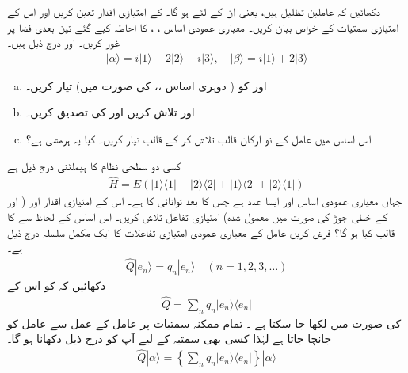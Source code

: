  
دکھائیں کہ عاملین تظلیل  ہیں، یعنی ان کے لئے ہو گا۔  کے امتیازی اقدار تعین کریں اور اس کے امتیازی سمتیات کے خواص بیان کریں۔
 معیاری عمودی اساس ،  ،  کا احاطہ کیے گئے تین بعدی فضا پر غور کریں۔  اور  درج ذیل ہیں۔ 
\begin{align*}
| \alpha \rangle = i | 1 \rangle -2|2\rangle -i|3\rangle , \quad | \beta \rangle = i|1\rangle +2|3\rangle 
\end{align*}
\begin{enumerate}[a.]
\item
  اور  کو ( دوہری اساس  ،،  کی صورت میں) تیار کریں۔ 
\item
  اور  تلاش کریں اور  کی تصدیق کریں۔
\item
 اس اساس میں عامل  کے نو ارکان قالب تلاش کر کے قالب  تیار کریں۔ کیا یہ ہرمشی ہے؟
\end{enumerate} 
کسی دو سطحی نظام کا ہیملٹنی درج ذیل ہے 
\begin{align*}
\hat{H} = E( | 1 \rangle \langle 1 | - |2\rangle \langle 2 | + | 1 \rangle \langle 2 | + | 2 \rangle \langle 1 | )
\end{align*}
جہاں  معیاری عمودی اساس اور  ایسا عدد ہے جس کا بعد توانائی کا ہے۔ اس کے امتیازی اقدار اور (  اور  کے خطی جوڑ کی صورت میں معمول شدہ) امتیازی تفاعل تلاش کریں۔ اس اساس کے لحاظ سے  کا قالب  کیا ہو گا؟ 
 فرض کریں عامل  کے معیاری عمودی امتیازی تفاعلات کا ایک مکمل سلسلہ درج ذیل ہے۔ 
\begin{align*}
\hat{Q}|e_{n} \rangle = q_{n} | e_{n} \rangle \quad (n = 1,2,3,\dotsc )
\end{align*}
دکھائیں کہ  کو اس کے
\begin{align*}
\hat{Q} = \sum_{n} q_{n} | e_{n} \rangle \langle e_{n} |
\end{align*}
 کی صورت میں لکھا جا سکتا ہے ۔  \quad 
 تمام ممکنہ سمتیات پر عامل کے عمل سے عامل کو جانچا جاتا ہے لہٰذا کسی بھی سمتیہ  کے لیے آپ کو درج ذیل دکھانا ہو گا۔ 
\begin{align*}
\hat{Q} | \alpha \rangle = \left\{ \sum_{n} q_{n} | e_{n} \rangle \langle e_{n} | \right\} | \alpha \rangle 
\end{align*}

